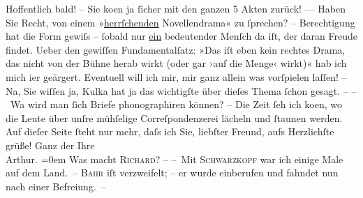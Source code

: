 \begin{ledgroupsized}[t]{13cm}
               Hoffentlich bald! – Sie {\pb}ko{\geminationm}en ja ſicher mit den ganzen 5 Akten zurück! ––\pend
           \pstart
           Haben Sie Recht, von einem »\uline{herrſchenden}
               Novellendrama« zu ſprechen? – Berechtigung hat die Form gewiſs – ſobald nur \uline{ein} bedeutender Menſch da iſt, der daran Freude
               findet. Ueber den gewiſſen Fundamentalſatz: »Das iſt eben kein rechtes Drama, das
               nicht von der Bühne herab wirkt (oder gar ›auf die Menge‹ wirkt)« hab ich {\pb}mich i{\geminationm}er geärgert. Eventuell will ich mir, mir ganz allein
               was vorſpielen laſſen! – Na, Sie wiſſen ja, Kulka hat ja das wichtigſte über dieſes Thema ſchon gesagt. –\pend
           \pstart
           – Wa{\geminationn} wird man ſich Briefe phonographiren können? – Die
               Zeit ſeh ich ko{\geminationm}en, wo die Leute über unſre mühſelige
               Correſpondenzerei lächeln und ſtaunen werden.\pend
           \pstart
           {\pb}Auf dieſer Seite ſteht nur mehr, daſs ich Sie, liebſter
               Freund, aufs Herzlichſte grüße!\pend
           \pstart
           Ganz der Ihre{\\[\baselineskip]}\spacefill\mbox{Arthur.}\pend
           \leftskip=0em{}\pstart
           \noindent{}Was macht \textsc{Richard}? –\pend
           \pstart
           – Mit \textsc{Schwarzkopf} war ich einige Male auf dem Land. –\pend
           \pstart
           \textsc{Bahr} iſt verzweifelt; – er wurde einberufen und fahndet nun nach einer
                  Befreiung. –\pend
           
         
         \endnumbering{}\end{ledgroupsized}  \newcommand{\dateiname}{L00112}\newcommand{\titel}{Arthur Schnitzler an Hugo von Hofmannsthal, [6. 8. 1892]}\newcommand{\editorInnen}{ Martin Anton Müller und Gerd-Hermann Susen}
      